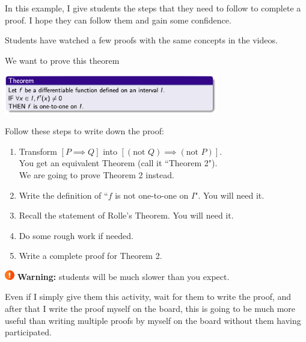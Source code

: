 \documentclass[11pt]{article}
\begin{document}
	\begin{example}
		In this example, I give students the steps that they need to follow to
		complete a proof. I hope they can follow them and gain some confidence.
		\begin{background}
			Students have watched a few proofs with the same concepts in the videos.
		\end{background}
		\begin{question}
			We want to prove this theorem
			\begin{center}
				\includegraphics[width=0.7\textwidth]{EX8}

				\vspace{.5cm}

				\begin{minipage}{0.7\textwidth}
					Follow these steps to write down the proof:
					\begin{enumerate}
						\item Transform \quad ${\displaystyle [P \implies Q]}$ \quad into \quad
							${\displaystyle  [(\text{not } Q) \implies (\text{not } P)]}$. \\
							You get an equivalent Theorem (call it ``Theorem 2"). \\ We are
							going to prove Theorem 2 instead.

						\item Write the definition of ``$f$ is not one-to-one on $I$". You will
							need it.

						\item Recall the statement of Rolle's Theorem. You will need it.

						\item Do some rough work if needed.

						\item Write a complete proof for Theorem 2.
					\end{enumerate}
				\end{minipage}
			\end{center}
			\includegraphics[height=12pt]{alert.png}
			\textbf{\textcolor{137cp3}{Warning:}} students will be much slower than
			you expect.
		\end{question}
		\begin{comments}
			Even if I simply give them this activity, wait for them to write the proof,
			and after that I write the proof myself on the board, this is going to be
			much more useful than writing multiple proofs by myself on the board
			without them having participated.
		\end{comments}
	\end{example}
\end{document}

